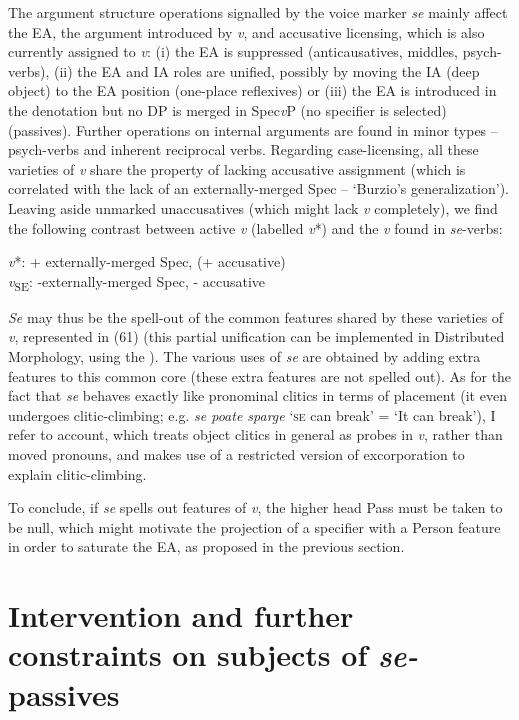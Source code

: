 \documentclass[output=paper]{langsci/langscibook}
\begin{document}
The argument structure operations signalled by the voice marker \textit{se} mainly affect the EA, the argument introduced by \textit{v}, and accusative licensing, which is also currently assigned to \textit{v}: (i) the EA is suppressed (anticausatives, middles, psych-verbs), (ii) the EA and IA roles are unified, possibly by moving the IA (deep object) to the EA position (one-place reflexives) or (iii) the EA is introduced in the denotation but no DP is merged in Spec\textit{v}P (no specifier is selected) (passives). Further operations on internal arguments are found in minor types – psych-verbs and inherent reciprocal verbs. Regarding case-licensing, all these varieties of \textit{v} share the property of lacking accusative assignment (which is correlated with the lack of an externally-merged Spec – ‘Burzio’s generalization'). Leaving aside unmarked unaccusatives (which might lack \textit{v} completely), we find the following contrast between active \textit{v} (labelled \textit{v}*) and the \textit{v} found in \textit{se}{}-verbs: 

\ea%
\label{ex:giurgea:61}
\label{bkm:Ref449274243}
\textit{v}*: + externally-merged Spec, (+ accusative)\\
\textit{v}\textsubscript{SE}: -externally-merged Spec, - accusative  
\z

\textit{Se} may thus be the spell-out of the common features shared by these varieties of \textit{v}, represented in (61) (this partial unification can be implemented in Distributed Morphology, using the ). The various uses of \textit{se} are obtained by adding extra features to this common core (these extra features are not spelled out). As for the fact that \textit{se} behaves exactly like pronominal clitics in terms of placement (it even undergoes clitic-climbing; e.g. \textit{se poate sparge} ‘\textsc{se} can break’ = ‘It can break’), I refer to  account, which treats object clitics in general as probes in \textit{v}, rather than moved pronouns, and makes use of a restricted version of excorporation to explain clitic-climbing.

  To conclude, if \textit{se} spells out features of \textit{v}, the higher head Pass must be taken to be null, which might motivate the projection of a specifier with a Person feature in order to saturate the EA, as proposed in the previous section.

\section{Intervention and further constraints on subjects of \textit{se-}passives}%
\end{document}
